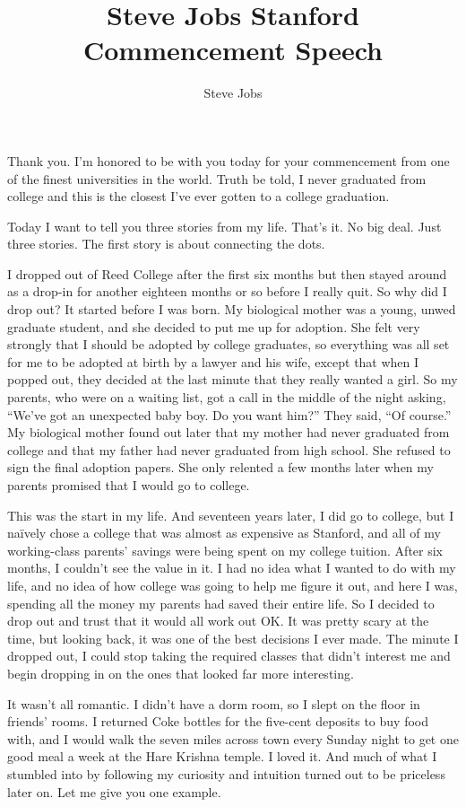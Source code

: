\documentclass[12pt,a4paper,twocolumn]{article}
\title{Steve Jobs Stanford Commencement Speech}
\author{Steve Jobs}
\begin{document}
\date{}
\maketitle
Thank you. I'm honored to be with you today for your commencement from one of the finest universities in the world. Truth be
told, I never graduated from college and this is the closest I've ever gotten to a college graduation.

Today I want to tell you three stories from my life. That's it. No big deal. Just three stories. The first story is about
connecting the dots.

I dropped out of Reed College after the first six months but then stayed around as a drop-in for another eighteen months or
so before I really quit. So why did I drop out? It started before I was born. My biological mother was a young, unwed
graduate student, and she decided to put me up for adoption. She felt very strongly that I should be adopted by college
graduates, so everything was all set for me to be adopted at birth by a lawyer and his wife, except that when I popped out,
they decided at the last minute that they really wanted a girl. So my parents, who were on a waiting list, got a call in the
middle of the night asking, ``We've got an unexpected baby boy. Do you want him?'' They said, ``Of course.'' My biological
mother found out later that my mother had never graduated from college and that my father had never graduated from high
school. She refused to sign the final adoption papers. She only relented a few months later when my parents promised that I
would go to college.

This was the start in my life. And seventeen years later, I did go to college, but I naïvely chose a college that was almost
as expensive as Stanford, and all of my working-class parents' savings were being spent on my college tuition. After six
months, I couldn't see the value in it. I had no idea what I wanted to do with my life, and no idea of how college was going
to help me figure it out, and here I was, spending all the money my parents had saved their entire life. So I decided to
drop out and trust that it would all work out OK. It was pretty scary at the time, but looking back, it was one of the best
decisions I ever made. The minute I dropped out, I could stop taking the required classes that didn't interest me and begin
dropping in on the ones that looked far more interesting.

It wasn't all romantic. I didn't have a dorm room, so I slept on the floor in friends' rooms. I returned Coke bottles for
the five-cent deposits to buy food with, and I would walk the seven miles across town every Sunday night to get one good
meal a week at the Hare Krishna temple. I loved it. And much of what I stumbled into by following my curiosity and intuition
turned out to be priceless later on. Let me give you one example.
\end{document}
